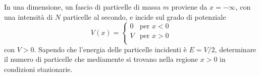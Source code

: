 \begin{esercizio}[(14/11/2024 n°1)]
   In una dimensione, un fascio di particelle di massa $m$ proviene da $x=-\infty$, con una intensità di $N$ particelle al secondo, e incide sul grado di potenziale
   \begin{equation*}
      V(x)=
      \begin{cases}
         0 & \text{per } x<0\\
         V & \text{per } x>0\\
      \end{cases}
   \end{equation*}
   con $V>0$. Sapendo che l'energia delle particelle incidenti è $E=V/2$, determinare il numero di particelle che mediamente si trovano nella regione $x>0$ in condizioni stazionarie.
\end{esercizio}
